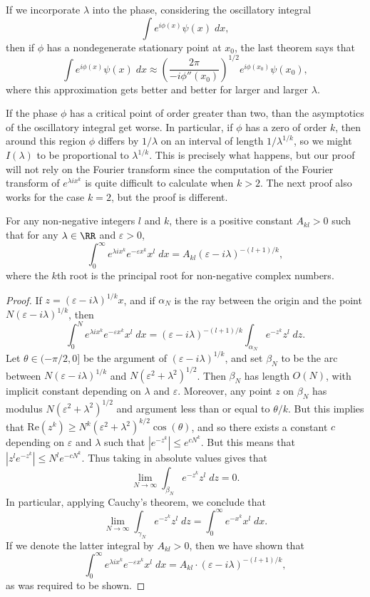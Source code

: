 \begin{remark}
  If we incorporate $\lambda$ into the phase, considering the oscillatory integral
  \[ \int e^{i \phi(x)} \psi(x)\; dx, \]
  then if $\phi$ has a nondegenerate stationary point at $x_0$, the last theorem says that
  \[ \int e^{i \phi(x)} \psi(x)\; dx \approx \left( \frac{2\pi}{-i \phi''(x_0)} \right)^{1/2} e^{i \phi(x_0)} \psi(x_0), \]
  where this approximation gets better and better for larger and larger $\lambda$.
\end{remark}

If the phase $\phi$ has a critical point of order greater than two, than the asymptotics of the oscillatory integral get worse. In particular, if $\phi$ has a zero of order $k$, then around this region $\phi$ differs by $1/\lambda$ on an interval of length $1/\lambda^{1/k}$, so we might $I(\lambda)$ to be proportional to $\lambda^{1/k}$. This is precisely what happens, but our proof will not rely on the Fourier transform since the computation of the Fourier transform of $e^{\lambda ix^k}$ is quite difficult to calculate when $k > 2$. The next proof also works for the case $k = 2$, but the proof is different.

\begin{lemma}
  For any non-negative integers $l$ and $k$, there is a positive constant $A_{kl} > 0$ such that for any $\lambda \in \RR$ and $\varepsilon > 0$,
  \[ \int_0^\infty e^{\lambda i x^k} e^{-\varepsilon x^k} x^l\; dx = A_{kl} (\varepsilon - i \lambda)^{-(l+1)/k}, \]
  where the $k$th root is the principal root for non-negative complex numbers.
\end{lemma}
\begin{proof}
  If $z = (\varepsilon - i \lambda)^{1/k} x$, and if $\alpha_N$ is the ray between the origin and the point $N (\varepsilon - i \lambda)^{1/k}$, then
  \[ \int_0^N e^{\lambda i x^k} e^{- \varepsilon x^k} x^l\; dx = (\varepsilon - i \lambda)^{-(l+1)/k} \int_{\alpha_N} e^{-z^k} z^l\; dz. \]
  Let $\theta \in (-\pi/2,0]$ be the argument of $(\varepsilon - i \lambda)^{1/k}$, and set $\beta_N$ to be the arc between $N ( \varepsilon - i \lambda)^{1/k}$ and $N (\varepsilon^2 + \lambda^2)^{1/2}$. Then $\beta_N$ has length $O(N)$, with implicit constant depending on $\lambda$ and $\varepsilon$. Moreover, any point $z$ on $\beta_N$ has modulus $N (\varepsilon^2 + \lambda^2)^{1/2}$ and argument less than or equal to $\theta / k$. But this implies that $\text{Re}(z^k) \geq N^k (\varepsilon^2 + \lambda^2)^{k/2} \cos(\theta)$, and so there exists a constant $c$ depending on $\varepsilon$ and $\lambda$ such that $|e^{-z^k}| \leq e^{c N^k}$. But this means that $|z^l e^{-z^k}| \leq N^l e^{-cN^k}$. Thus taking in absolute values gives that
  \[ \lim_{N \to \infty} \int_{\beta_N} e^{-z^k} z^l\; dz = 0. \]
  In particular, applying Cauchy's theorem, we conclude that
  \[ \lim_{N \to \infty} \int_{\gamma_N} e^{-z^k} z^l\; dz = \int_0^\infty e^{-x^k} x^l\; dx. \]
  If we denote the latter integral by $A_{kl} > 0$, then we have shown that
  \[ \int_0^\infty e^{\lambda i x^k} e^{-\varepsilon x^k} x^l\; dx = A_{kl} \cdot (\varepsilon - i \lambda)^{-(l+1)/k}, \]
  as was required to be shown.
\end{proof}

